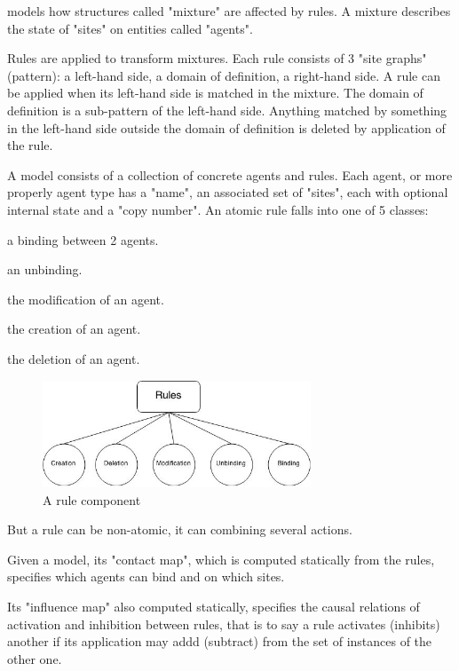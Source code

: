 \documentclass{article}
\begin{document}
\kapa models how structures called "mixture" are affected by rules. A
mixture describes the state of "sites" on entities called "agents".

Rules are applied to transform mixtures. Each rule consists of 3 "site
graphs" (pattern): a left-hand side, a domain of definition, a right-hand
side. A rule can be applied when its left-hand side is matched in the
mixture. The domain of definition is a sub-pattern of the left-hand
side. Anything matched by something in the left-hand side outside the
domain of definition is deleted by application of the rule.

A \kapa model consists of a collection of concrete agents and rules. Each
agent, or more properly agent type has a "name", an associated set of
"sites", each with optional internal state and a "copy number". An atomic
rule falls into one of 5 classes:

\begin{i}
\item a binding between 2 agents.
\item an unbinding.
\item the modification of an agent.
\item the creation of an agent.
\item the deletion of an agent.
\end{i}

\begin{figure}[ht!]
\centering
\includegraphics[width=80mm]{rules.jpg}
\caption{A rule component \label{rule}}
\end{figure}

But a rule can be non-atomic, it can combining several actions.

Given a \kapa model, its "contact map", which is computed statically from
the rules, specifies which agents can bind and on which sites.

Its "influence map" also computed statically, specifies the causal
relations of activation and inhibition between rules, that is to say a rule
activates (inhibits) another if its application may addd (subtract) from
the set of instances of the other one.

\end{document}
